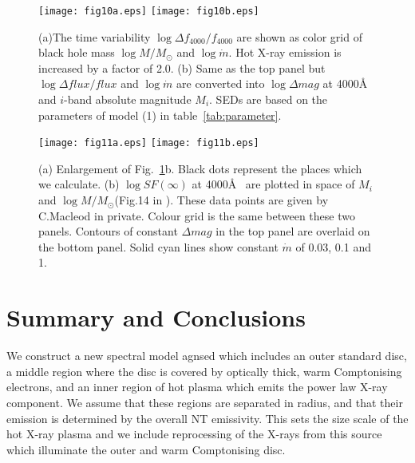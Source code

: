 \documentclass[a4paper,fleqn,usenatbib]{mnras}
\begin{document}
\begin{figure}
\begin{center}
\texttt{[image: fig10a.eps]}
\texttt{[image: fig10b.eps]}
\end{center}
    \caption{(a)The time variability $\log \Delta f_{4000}/f_{4000}$ are shown as color grid of 
    black hole mass $\log M/M_\odot$ and  $\log \dot{m}$. Hot X-ray emission is increased by a factor of 2.0. 
    (b) Same as the top panel but $\log \Delta flux/flux$ and $\log \dot{m}$ are converted into 
    $\log \Delta mag$ at 4000\AA~ and $i$-band absolute magnitude $M_i$. SEDs are based on the parameters of model (1) in table~\ref{tab:parameter}.}
   \label{fig:variability}
\end{figure}

\begin{figure}
\begin{center}
\texttt{[image: fig11a.eps]}
\texttt{[image: fig11b.eps]}
\end{center}
    \caption{ (a) Enlargement of Fig.~\ref{fig:variability}b. Black dots represent the places which we calculate.  
    (b) $\log SF(\infty)$ at 4000\AA~ are plotted 
    in space of $M_i$ and $\log M/M_\odot$(Fig.14 in \citealt{macleod2010}). These data points are given by
 C.Macleod in private. Colour grid is the same between these two panels.
 Contours of  constant $\Delta mag$ in the top panel are overlaid on the bottom panel. Solid cyan lines show 
 constant $\dot{m}$ of 0.03, 0.1 and 1.}
   \label{fig:macleod}
\end{figure}

\section{Summary and Conclusions}

We construct a new spectral model {\sc agnsed}   which includes an outer
standard disc, a middle region where the disc is covered by optically
thick, warm Comptonising electrons, and an inner region of hot plasma
which emits the power law X-ray component. We assume that these
regions are separated in radius, and that their emission is determined
by the overall NT emissivity. This sets the size scale of
the hot X-ray plasma and we include reprocessing of the X-rays from
this source which illuminate the outer and warm Comptonising disc.
\end{document}
